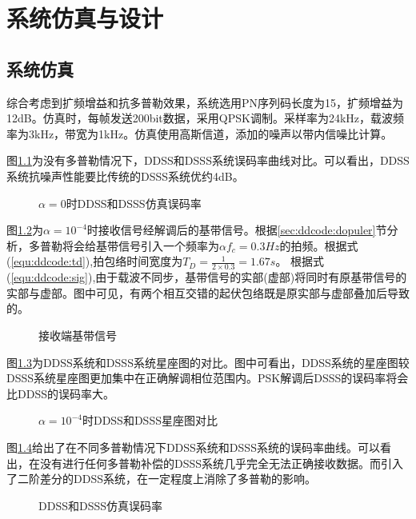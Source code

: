 \chapter{系统仿真与设计}
\section{系统仿真}
综合考虑到扩频增益和抗多普勒效果，系统选用PN序列码长度为15，扩频增益为12dB。仿真时，每帧发送200bit数据，采用QPSK调制。采样率为24kHz，载波频率为3kHz，带宽为1kHz。仿真使用高斯信道，添加的噪声以带内信噪比计算。

图\ref{fig:software:dop0}为没有多普勒情况下，DDSS和DSSS系统误码率曲线对比。可以看出，DDSS系统抗噪声性能要比传统的DSSS系统优约4dB。
\begin{figure}[!htbp]
	\centering
	
	\caption{$\alpha=0$时DDSS和DSSS仿真误码率}
	\label{fig:software:dop0}
\end{figure}

图\ref{fig:software:sig}为$\alpha=10^{-4}$时接收信号经解调后的基带信号。根据\ref{sec:ddcode:dopuler}节分析，多普勒将会给基带信号引入一个频率为$\alpha f_c=0.3Hz$的拍频。根据式(\ref{equ:ddcode:td}),拍包络时间宽度为$T_D=\frac{1}{2\times0.3}=1.67s$。
根据式(\ref{equ:ddcode:sig}),由于载波不同步，基带信号的实部(虚部)将同时有原基带信号的实部与虚部。图中可见，有两个相互交错的起伏包络既是原实部与虚部叠加后导致的。
\begin{figure}[htbp]
	\centering
	
	\caption{接收端基带信号}
	\label{fig:software:sig}
\end{figure}

图\ref{fig:software:scatter}为DDSS系统和DSSS系统星座图的对比。图中可看出，DDSS系统的星座图较DSSS系统星座图更加集中在正确解调相位范围内。PSK解调后DSSS的误码率将会比DDSS的误码率大。
\begin{figure}[htbp]
\centering
\begin{minipage}{0.45\textwidth}
	\centering
	\subfigure[DDSS星座图]{
		
	}
\end{minipage}	
\begin{minipage}{0.45\textwidth}
	\centering
	\subfigure[DSSS星座图]{
		
	}
\end{minipage}
\caption{$\alpha=10^{-4}$时DDSS和DSSS星座图对比}
\label{fig:software:scatter}
\end{figure}

图\ref{fig:software:dp1}给出了在不同多普勒情况下DDSS系统和DSSS系统的误码率曲线。可以看出，在没有进行任何多普勒补偿的DSSS系统几乎完全无法正确接收数据。而引入了二阶差分的DDSS系统，在一定程度上消除了多普勒的影响。
\begin{figure}[!htbp]
	\centering
	
	\caption{DDSS和DSSS仿真误码率}
	\label{fig:software:dp1}
\end{figure}

